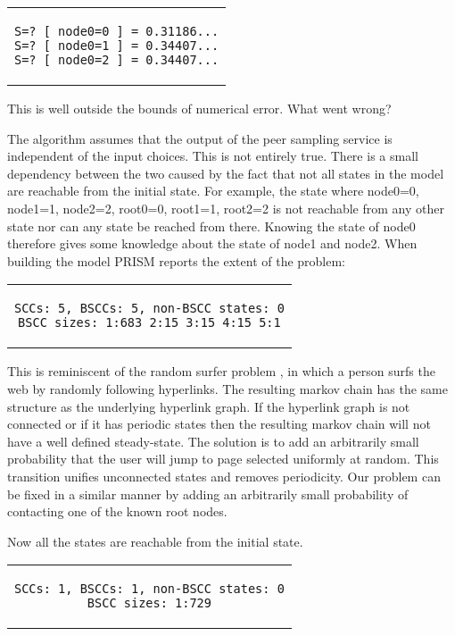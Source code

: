 \documentclass[a4paper,10pt]{article}
\newcommand{\prismmodel}[1]{
  \begin{quotation}
  \footnotesize
  
  \end{quotation}
}
\newenvironment{prismprop}[0]{
  \begin{center}
  \begin{tabular}{c}
  \footnotesize
}{
  \end{tabular}
  \end{center}
}
\begin{document}
\begin{prismprop}
\begin{lstlisting}
S=? [ node0=0 ] = 0.31186...
S=? [ node0=1 ] = 0.34407...
S=? [ node0=2 ] = 0.34407...
\end{lstlisting}
\end{prismprop}

This is well outside the bounds of numerical error. What went wrong? 

The algorithm assumes that the output of the peer sampling service is independent of the input choices. This is not entirely true. There is a small dependency between the two caused by the fact that not all states in the model are reachable from the initial state. For example, the state where node0=0, node1=1, node2=2, root0=0, root1=1, root2=2 is not reachable from any other state nor can any state be reached from there. Knowing the state of node0 therefore gives some knowledge about the state of node1 and node2. When building the model PRISM reports the extent of the problem:

\begin{prismprop}
\begin{lstlisting}
SCCs: 5, BSCCs: 5, non-BSCC states: 0
BSCC sizes: 1:683 2:15 3:15 4:15 5:1
\end{lstlisting}
\end{prismprop}

This is reminiscent of the random surfer problem \cite{random_surfer}, in which a person surfs the web by randomly following hyperlinks. The resulting markov chain has the same structure as the underlying hyperlink graph. If the hyperlink graph is not connected or if it has periodic states then the resulting markov chain will not have a well defined steady-state. The solution is to add an arbitrarily small probability that the user will jump to page selected uniformly at random. This transition unifies unconnected states and removes periodicity. Our problem can be fixed in a similar manner by adding an arbitrarily small probability of contacting one of the known root nodes.

\prismmodel{ctmc_full}

Now all the states are reachable from the initial state.

\begin{prismprop}
\begin{lstlisting}
SCCs: 1, BSCCs: 1, non-BSCC states: 0
BSCC sizes: 1:729
\end{lstlisting}
\end{prismprop}
\end{document}
